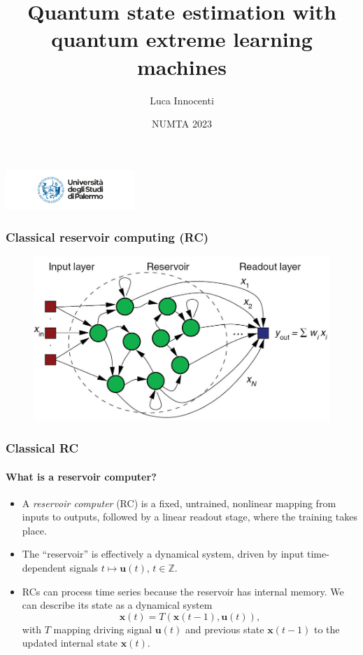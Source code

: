 \documentclass{beamer}
\title{Quantum state estimation with quantum extreme learning
machines}
\author{Luca Innocenti}
\date{NUMTA 2023}
\begin{document}
\begin{frame}
  \titlepage
  \hfill\includegraphics[height=1.5cm]{figures/logo-unipa-2020.png}
\end{frame}

\begin{frame}
\frametitle{Classical reservoir computing (RC)}

\begin{figure}
    \centering
    \includegraphics[width=\linewidth]{figures/scheme_RC.jpg}
\end{figure}

\end{frame}


\begin{frame}
  \frametitle{Classical RC}
  \framesubtitle{What is a reservoir computer?}
  
  \begin{itemize}
      \item A \textit{reservoir computer} (RC) is a fixed, untrained, nonlinear mapping from inputs to outputs, followed by a linear readout stage, where the training takes place.
      \item The ``reservoir'' is effectively a dynamical system, driven by input time-dependent signals $t\mapsto \mathbf u(t)$, $t\in\mathbb{Z}$.
      \item RCs can process time series because the reservoir has internal memory. We can describe its state as a dynamical system
      \begin{equation}
          \mathbf x(t)=T(\mathbf x(t-1),\mathbf u(t)),
      \end{equation}
      with $T$ mapping driving signal $\mathbf u(t)$ and previous state $\mathbf x(t-1)$ to the updated internal state $\mathbf x(t)$.
  \end{itemize}
\end{frame}
\end{document}
